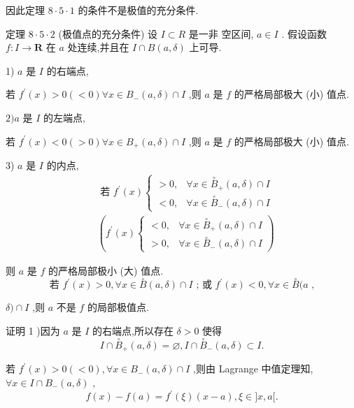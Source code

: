 因此定理 $8 \cdot  5 \cdot  1$ 的条件不是极值的充分条件.

定理 $8 \cdot  5 \cdot  2$ (极值点的充分条件) 设 $I \subset  R$ 是一非 空区间, $a \in  I$ . 假设函数 $f : I \rightarrow  \mathbf{R}$ 在 $a$ 处连续,并且在 $I \cap  B\left( {a,\delta }\right)$ 上可导.

1) $a$ 是 $I$ 的右端点,

若 ${f}^{\prime }\left( x\right)  > 0\left( { < 0}\right) \forall x \in  {B}_{ - }\left( {a,\delta }\right)  \cap  I$ ,则 $a$ 是 $f$ 的严格局部极大 (小) 值点.

$2)a$ 是 $I$ 的左端点,

若 ${f}^{\prime }\left( x\right)  < 0\left( { > 0}\right) \forall x \in  {B}_{ + }\left( {a,\delta }\right)  \cap  I$ ,则 $a$ 是 $f$ 的严格局部极大 (小) 值点.

3) $a$ 是 $I$ 的内点,
\begin{align*}
	&\text{ 若 }{f}^{\prime }\left( x\right) \left\{  \begin{array}{ll}  > 0, & \forall x \in  {\overset{ \circ  }{B}}_{ + }\left( {a,\delta }\right)  \cap  I \\   < 0, & \forall x \in  {\overset{ \circ  }{B}}_{ - }\left( {a,\delta }\right)  \cap  I \end{array}\right.\\
	&\left( {{f}^{\prime }\left( x\right) \left\{  \begin{array}{ll}  < 0, & \forall x \in  {\overset{ \circ  }{B}}_{ + }\left( {a,\delta }\right)  \cap  I \\   > 0, & \forall x \in  {\overset{ \circ  }{B}}_{ - }\left( {a,\delta }\right)  \cap  I \end{array}\right) }\right.
\end{align*}

则 $a$ 是 $f$ 的严格局部极小 (大) 值点.
$$\text{ 若 }{f}^{\prime }\left( x\right)  > 0,\forall x \in  \overset{ \circ  }{B}\left( {a,\delta }\right)  \cap  I\text{ ; 或 }{f}^{\prime }\left( x\right)  < 0,\forall x \in  \overset{ \circ  }{B}(a\text{ , }$$

$\delta ) \cap  I$ ,则 $a$ 不是 $f$ 的局部极值点.

证明 1 )因为 $a$ 是 $I$ 的右端点,所以存在 $\delta  > 0$ 使得
$$I \cap  {\overset{ \circ  }{B}}_{ + }\left( {a,\delta }\right)  = \varnothing ,I \cap  {\overset{ \circ  }{B}}_{ - }\left( {a,\delta }\right)  \subset  I.$$

若 ${f}^{\prime }\left( x\right)  > 0\left( { < 0}\right) ,\forall x \in  {B}_{ - }\left( {a,\delta }\right)  \cap  I$ ,则由 Lagrange 中值定理知, $\forall x \in  I \cap  {B}_{ - }\left( {a,\delta }\right)$ ,
$$f\left( x\right)  - f\left( a\right)  = {f}^{\prime }\left( \xi \right) \left( {x - a}\right) ,\xi  \in  \rbrack x,a\lbrack .$$

